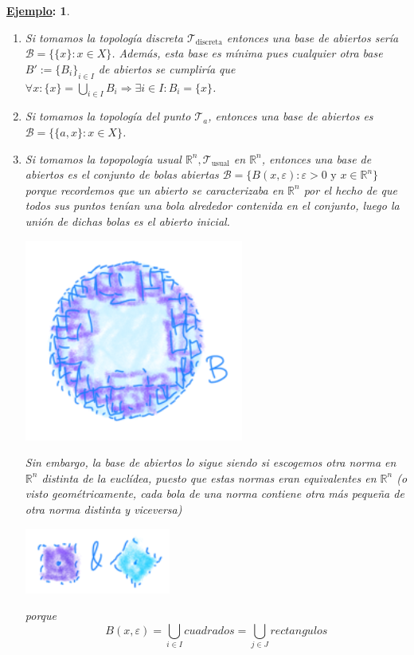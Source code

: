 \documentclass[10pt,a4paper,openright]{book}
\theoremstyle{break}
\newtheorem*{ej}{\underline{Ejemplo}:}
\begin{document}
\begin{ej}
\begin{enumerate}
    \item Si tomamos la topología discreta $\mathcal{T}_{\text{discreta}}$ entonces una base de abiertos sería $\mathcal{B} = \{\{x\} : x \in X\}$. Además, esta base es mínima pues cualquier otra base $B' := \{B_i\}_{i\in I}$ de abiertos se cumpliría que $\forall x  : \{x\} = \bigcup_{i \in  I} B_i \Rightarrow \exists i \in I : B_i = \{x\}$.
    \item Si tomamos la topología del punto $\mathcal{T}_a$, entonces una base de abiertos es $\mathcal{B} = \{\{a, x\} : x \in X\}$.
    \item Si tomamos la topopología usual $\mathbb{R}^n, \mathcal{T}_{\text{usual}}$ en $\mathbb{R}^n$, entonces una base de abiertos es el conjunto de bolas abiertas $\mathcal{B} = \{B\left( x, \varepsilon \right) : \varepsilon > 0 \mbox{ y } x \in \mathbb{R}^n\}$ porque recordemos que un abierto se caracterizaba en $\mathbb{R}^n$ por el hecho de que todos sus puntos tenían una bola alrededor contenida en el conjunto, luego la unión de dichas bolas es el abierto inicial.
    \begin{center}
        \includegraphics[scale=0.3]{images/base_rn} 
    \end{center}
    Sin embargo, la base de abiertos lo sigue siendo si escogemos otra norma en $\mathbb{R}^n$ distinta de la euclídea, puesto que estas normas eran equivalentes en $\mathbb{R}^n$ (o visto geométricamente, cada bola de una norma contiene otra más pequeña de otra norma distinta y viceversa)
    \begin{center}
        \includegraphics[scale=0.3]{images/bases_alternativas_rn} 
    \end{center}
    porque
    \[
    B\left( x, \varepsilon \right) = \bigcup_{i \in  I} cuadrados = \bigcup_{j \in J} rectangulos
    \]
\end{enumerate}
\end{ej}
\end{document}
